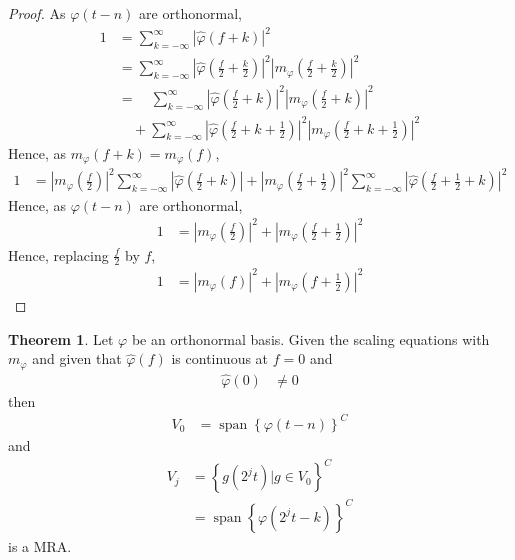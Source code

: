 \documentclass[titlepage, fleqn, a4paper, 12pt, twoside]{article}
\theoremstyle{definition}
\theoremstyle{theorem}
\newtheorem{theorem}{Theorem}
\DeclareMathOperator{\vspan}{\mathrm{span}}
\begin{document}
\begin{proof}
	As $\varphi(t - n)$ are orthonormal,
	\begin{align*}
		1 &= \sum\limits_{k = -\infty}^{\infty} \left| \hat{\varphi}(f + k) \right|^2\\
		&= \sum\limits_{k = -\infty}^{\infty} \left| \hat{\varphi}\left( \frac{f}{2} + \frac{k}{2} \right) \right|^2 \left| m_{\varphi}\left( \frac{f}{2} + \frac{k}{2} \right) \right|^2\\
		&= \quad\sum\limits_{k = -\infty}^{\infty} \left| \hat{\varphi}\left( \frac{f}{2} + k \right) \right|^2 \left| m_{\varphi}\left( \frac{f}{2} + k \right) \right|^2\\
		&\quad + \sum\limits_{k = -\infty}^{\infty} \left| \hat{\varphi}\left( \frac{f}{2} + k + \frac{1}{2} \right) \right|^2 \left| m_{\varphi}\left( \frac{f}{2} + k + \frac{1}{2} \right) \right|^2
	\end{align*}
	Hence, as $m_{\varphi}(f + k) = m_{\varphi}(f)$,
	\begin{align*}
		1 &= \left| m_{\varphi}\left( \frac{f}{2} \right) \right|^2 \sum\limits_{k = -\infty}^{\infty} \left| \hat{\varphi}\left( \frac{f}{2} + k \right) \right| + \left| m_{\varphi}\left( \frac{f}{2} + \frac{1}{2} \right) \right|^2 \sum\limits_{k = -\infty}^{\infty} \left| \hat{\varphi}\left( \frac{f}{2} + \frac{1}{2} + k \right) \right|^2
	\end{align*}
	Hence, as $\varphi(t - n)$ are orthonormal,
	\begin{align*}
		1 &= \left| m_{\varphi}\left( \frac{f}{2} \right) \right|^2 + \left| m_{\varphi}\left( \frac{f}{2} + \frac{1}{2} \right) \right|^2
	\end{align*}
	Hence, replacing $\frac{f}{2}$ by $f$,
	\begin{align*}
		1 &= \left| m_{\varphi}(f) \right|^2 + \left| m_{\varphi}\left( f + \frac{1}{2} \right) \right|^2
	\end{align*}
\end{proof}

\begin{theorem}
	Let $\varphi$ be an orthonormal basis.
	Given the scaling equations with $m_{\varphi}$ and given that $\hat{\varphi}(f)$ is continuous at $f = 0$ and
	\begin{align*}
		\hat{\varphi}(0) &\neq 0
	\end{align*}
	then
	\begin{align*}
		V_0 &= {\vspan\left\{ \varphi(t - n) \right\}}^{C}
	\end{align*}
	and
	\begin{align*}
		V_j &= {\left\{ g\left( 2^j t \right) \Big| g \in V_0 \right\}}^{C}\\
		&= \vspan\left\{ \varphi\left( 2^j t - k \right) \right\}^{C}
	\end{align*}
	is a MRA.
\end{theorem}
\end{document}
